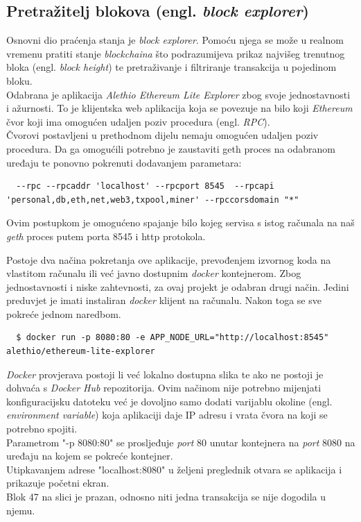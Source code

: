 \documentclass[times, utf8, zavrsni]{fer}
\begin{document}
\subsection{Pretražitelj blokova (engl. \emph{block explorer})}
Osnovni dio praćenja stanja je \emph{block explorer}. Pomoću njega se može u realnom vremenu pratiti stanje \emph{blockchaina}
što podrazumijeva prikaz najvišeg trenutnog bloka (engl. \emph{block height}) te pretraživanje i filtriranje transakcija u 
pojedinom bloku. \\
Odabrana je aplikacija \emph{Alethio Ethereum Lite Explorer} zbog svoje jednostavnosti i ažurnosti. To je klijentska
web aplikacija koja se povezuje na bilo koji \emph{Ethereum} čvor koji ima omogućen udaljen poziv procedura (engl. \emph{RPC}). \\
Čvorovi postavljeni u prethodnom dijelu nemaju omogućen udaljen poziv procedura. Da ga omogućili potrebno je zaustaviti geth proces
na odabranom uređaju te ponovno pokrenuti dodavanjem parametara:

\begin{lstlisting}
  --rpc --rpcaddr 'localhost' --rpcport 8545  --rpcapi 'personal,db,eth,net,web3,txpool,miner' --rpccorsdomain "*"
\end{lstlisting}

Ovim postupkom je omogućeno spajanje bilo kojeg servisa s istog računala na naš \emph{geth} proces putem porta 8545 i http protokola.

Postoje dva načina pokretanja ove aplikacije, prevođenjem izvornog koda na vlastitom računalu ili već javno dostupnim
\emph{docker} kontejnerom. Zbog jednostavnosti i niske zahtevnosti, za ovaj projekt je odabran drugi način.
Jedini preduvjet je imati instaliran \emph{docker} klijent na računalu. Nakon toga se sve pokreće jednom naredbom.

\begin{lstlisting}
  $ docker run -p 8080:80 -e APP_NODE_URL="http://localhost:8545" alethio/ethereum-lite-explorer
\end{lstlisting}

\emph{Docker} provjerava postoji li već lokalno dostupna slika te ako ne postoji je dohvaća s \emph{Docker Hub} repozitorija.
Ovim načinom nije potrebno mijenjati konfiguracijsku datoteku već je dovoljno samo dodati varijablu okoline (engl. \emph{environment variable})
koja aplikaciji daje IP adresu i vrata čvora na koji se potrebno spojiti. \\
Parametrom "-p 8080:80" se prosljeđuje \emph{port} 80 unutar kontejnera na \emph{port} 8080 na uređaju na kojem se pokreće kontejner. \\
Utipkavanjem adrese "localhost:8080" u željeni preglednik otvara se aplikacija i prikazuje početni ekran. \\
Blok 47 na slici je prazan, odnosno niti jedna transakcija se nije dogodila u njemu.
\end{document}
